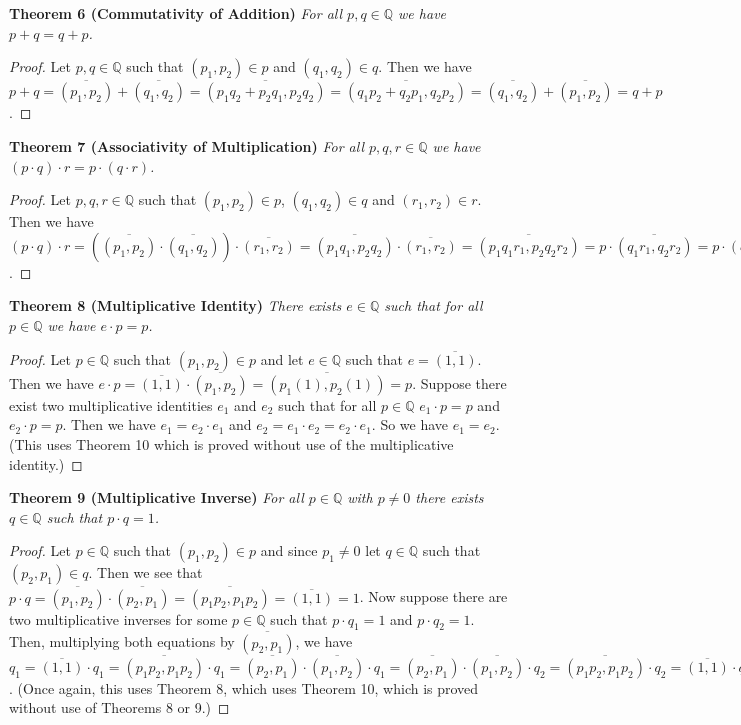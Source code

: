 \documentclass{article}
\begin{document}
\begin{flushleft}
\textbf{Theorem 6 (Commutativity of Addition)}
\textsl{For all $p,q \in \mathbb{Q}$ we have $p+q=q+p$.}
\begin{proof}
Let $p,q \in \mathbb{Q}$ such that $(p_1,p_2) \in p$ and $(q_1,q_2) \in q$. Then we have $p+q=\overline{(p_1,p_2)}+\overline{(q_1,q_2)}=\overline{(p_1q_2+p_2q_1,p_2q_2)}=\overline{(q_1p_2+q_2p_1,q_2p_2)}=\overline{(q_1,q_2)}+\overline{(p_1,p_2)}=q+p$.
\end{proof}

\textbf{Theorem 7 (Associativity of Multiplication)}
\textsl{For all $p,q,r \in \mathbb{Q}$ we have $(p \cdot q) \cdot r = p \cdot (q \cdot r)$.}
\begin{proof}
Let $p,q,r \in \mathbb{Q}$ such that $(p_1,p_2) \in p$, $(q_1,q_2) \in q$ and $(r_1,r_2) \in r$. Then we have $(p \cdot q) \cdot r=\left(\overline{(p_1,p_2)} \cdot \overline{(q_1,q_2)}\right) \cdot \overline{(r_1,r_2)}=\overline{(p_1q_1,p_2q_2)} \cdot \overline{(r_1,r_2)}=\overline{(p_1q_1r_1,p_2q_2r_2)}=p \cdot \overline{(q_1r_1,q_2r_2)}=p \cdot (q \cdot r)$.
\end{proof}

\textbf{Theorem 8 (Multiplicative Identity)}
\textsl{There exists $e \in \mathbb{Q}$ such that for all $p \in \mathbb{Q}$ we have $e \cdot p=p$.}
\begin{proof}
Let $p \in \mathbb{Q}$ such that $(p_1,p_2) \in p$ and let $e \in \mathbb{Q}$ such that $e = \overline{(1,1)}$. Then we have $e \cdot p = \overline{(1,1)} \cdot \overline{(p_1,p_2)} = \overline{(p_1(1),p_2(1))} = p$. Suppose there exist two multiplicative identities $e_1$ and $e_2$ such that for all $p \in \mathbb{Q}$ $e_1 \cdot p = p$ and $e_2 \cdot p = p$. Then we have $e_1 = e_2 \cdot e_1$ and $e_2 = e_1 \cdot e_2 = e_2 \cdot e_1$. So we have $e_1 = e_2$. (This uses Theorem 10 which is proved without use of the multiplicative identity.)
\end{proof}

\textbf{Theorem 9 (Multiplicative Inverse)}
\textsl{For all $p \in \mathbb{Q}$ with $p \neq 0$ there exists $q \in \mathbb{Q}$ such that $p \cdot q=1$.}
\begin{proof}
Let $p \in \mathbb{Q}$ such that $(p_1,p_2) \in p$ and since $p_1 \neq 0$ let $q \in \mathbb{Q}$ such that $(p_2,p_1) \in q$. Then we see that $p \cdot q = \overline{(p_1,p_2)} \cdot \overline{(p_2,p_1)} = \overline{(p_1p_2,p_1p_2)}=\overline{(1,1)}=1$. Now suppose there are two multiplicative inverses for some $p \in \mathbb{Q}$ such that $p \cdot q_1=1$ and $p \cdot q_2=1$. Then, multiplying both equations by $\overline{(p_2,p_1)}$, we have $q_1=\overline{(1,1)} \cdot q_1=\overline{(p_1p_2,p_1p_2)} \cdot q_1=\overline{(p_2,p_1)} \cdot \overline{(p_1,p_2)} \cdot q_1=\overline{(p_2,p_1)} \cdot \overline{(p_1,p_2)} \cdot q_2=\overline{(p_1p_2,p_1p_2)} \cdot q_2=\overline{(1,1)} \cdot q_2=q_2$. (Once again, this uses Theorem 8, which uses Theorem 10, which is proved without use of Theorems 8 or 9.)
\end{proof}


\end{flushleft}
\end{document}
